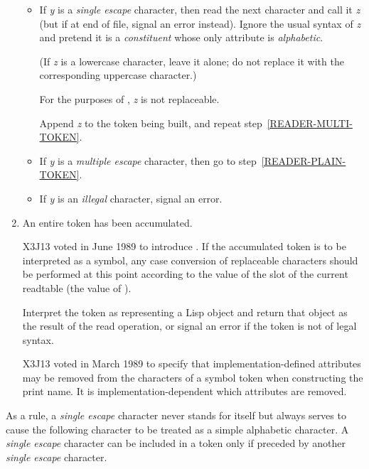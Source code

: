 \begin{enumerate}
\begin{itemize}
\item
If \emph{y} is a \emph{single escape} character, then read the next character
and call it \emph{z}
(but if at end of file, signal an error instead).
Ignore the usual syntax of \emph{z}
and pretend it is a \emph{constituent} whose only attribute is
\emph{alphabetic}.
\begin{obsolete}
(If \emph{z} is a lowercase character, leave it alone;
do not replace it with the corresponding uppercase character.)
\end{obsolete}
\begin{newer}
For the purposes of , \emph{z} is not replaceable.
\end{newer}
Append \emph{z} to the token being built,
and repeat step~\ref{READER-MULTI-TOKEN}.

\item
If \emph{y} is a \emph{multiple escape} character,
then go to step~\ref{READER-PLAIN-TOKEN}.

\item
If \emph{y} is an \emph{illegal} character, signal an error.
\end{itemize}

\item
An entire token has been accumulated.
\begin{newer}
X3J13 voted in June 1989  to introduce
.  If the accumulated token
is to be interpreted as a symbol, any case conversion of replaceable
characters should be performed at this point according to the value
of the  slot of the current readtable (the value
of ).
\end{newer}
Interpret the token as representing
a Lisp object and return that object as the result
of the read operation, or signal an error if the token
is not of legal syntax.
\begin{newer}
X3J13 voted in March 1989 
to specify that implementation-defined
attributes may be removed from the characters of a symbol token
when constructing the print name.
It is implementation-dependent which attributes are removed.
\end{newer}
\label{READER-TOKEN-END}
\end{enumerate}
\endgroup

As a rule, a \emph{single escape} character never stands for itself but always
serves to cause the following character to be treated as a simple alphabetic
character.  A \emph{single escape} character can be included in a token only
if preceded by another \emph{single escape} character.

